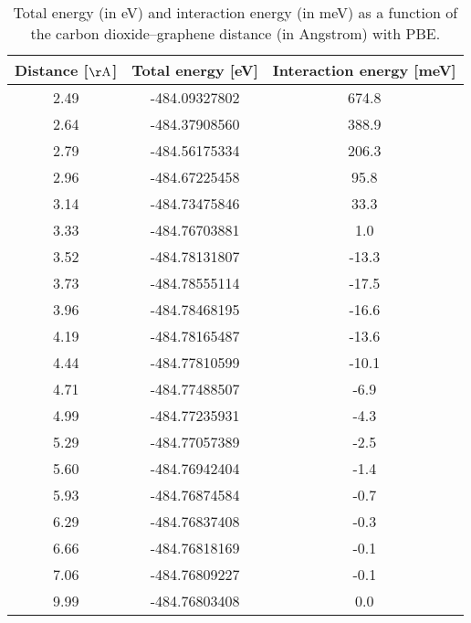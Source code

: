 \begin{table}[h]
\centering
\begin{tabular}{ccc}
\hline
Distance [$\mathrm{\AA}$] & Total energy [eV] & Interaction energy [meV] \\
\hline
2.49 & -484.09327802 & 674.8 \\
2.64 & -484.37908560 & 388.9 \\
2.79 & -484.56175334 & 206.3 \\
2.96 & -484.67225458 & 95.8 \\
3.14 & -484.73475846 & 33.3 \\
3.33 & -484.76703881 & 1.0 \\
3.52 & -484.78131807 & -13.3 \\
3.73 & -484.78555114 & -17.5 \\
3.96 & -484.78468195 & -16.6 \\
4.19 & -484.78165487 & -13.6 \\
4.44 & -484.77810599 & -10.1 \\
4.71 & -484.77488507 & -6.9 \\
4.99 & -484.77235931 & -4.3 \\
5.29 & -484.77057389 & -2.5 \\
5.60 & -484.76942404 & -1.4 \\
5.93 & -484.76874584 & -0.7 \\
6.29 & -484.76837408 & -0.3 \\
6.66 & -484.76818169 & -0.1 \\
7.06 & -484.76809227 & -0.1 \\
9.99 & -484.76803408 & 0.0 \\
\hline
\end{tabular}
\caption{Total energy (in eV) and interaction energy (in meV) as a function of the carbon dioxide--graphene distance (in Angstrom) with PBE.}
\label{SI_dft_table_PBE}
\end{table}